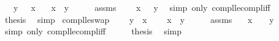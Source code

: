 \begin{isabellebody}
\ \ \ {\isachardoublequoteopen}y\ {\isasymle}\ {\isacharminus}{\kern0pt}\ x{\isachardoublequoteclose}\isanewline
\ \ \ {\isachardoublequoteopen}x\ {\isasymle}\ {\isacharminus}{\kern0pt}y{\isachardoublequoteclose}\isanewline
%
\isadelimproof
%
\endisadelimproof
%
\isatagproof
{}\isamarkupfalse%
\ {\isacharminus}{\kern0pt}\isanewline
\ \ \isamarkupfalse%
\ assms\ \isamarkupfalse%
\ {\isachardoublequoteopen}{\isacharminus}{\kern0pt}\ {\isacharparenleft}{\kern0pt}{\isacharminus}{\kern0pt}\ x{\isacharparenright}{\kern0pt}\ {\isasymle}\ {\isacharminus}{\kern0pt}\ y{\isachardoublequoteclose}\ \isamarkupfalse%
\ {\isacharparenleft}{\kern0pt}simp\ only{\isacharcolon}{\kern0pt}\ compl{\isacharunderscore}{\kern0pt}le{\isacharunderscore}{\kern0pt}compl{\isacharunderscore}{\kern0pt}iff{\isacharparenright}{\kern0pt}\isanewline
\ \ \isamarkupfalse%
\ \isamarkupfalse%
\ {\isacharquery}{\kern0pt}thesis\ \isamarkupfalse%
\ simp\isanewline
{}\isamarkupfalse%
%
\endisatagproof
{\isafoldproof}%
%
\isadelimproof
\isanewline
%
\endisadelimproof
\isanewline
{}\isamarkupfalse%
\ compl{\isacharunderscore}{\kern0pt}le{\isacharunderscore}{\kern0pt}swap{}{\isacharcolon}{\kern0pt}\isanewline
\ \ \ {\isachardoublequoteopen}{\isacharminus}{\kern0pt}\ y\ {\isasymle}\ x{\isachardoublequoteclose}\isanewline
\ \ \ {\isachardoublequoteopen}{\isacharminus}{\kern0pt}\ x\ {\isasymle}\ y{\isachardoublequoteclose}\isanewline
%
\isadelimproof
%
\endisadelimproof
%
\isatagproof
{}\isamarkupfalse%
\ {\isacharminus}{\kern0pt}\isanewline
\ \ \isamarkupfalse%
\ assms\ \isamarkupfalse%
\ {\isachardoublequoteopen}{\isacharminus}{\kern0pt}\ x\ {\isasymle}\ {\isacharminus}{\kern0pt}\ {\isacharparenleft}{\kern0pt}{\isacharminus}{\kern0pt}\ y{\isacharparenright}{\kern0pt}{\isachardoublequoteclose}\ \isamarkupfalse%
\ {\isacharparenleft}{\kern0pt}simp\ only{\isacharcolon}{\kern0pt}\ compl{\isacharunderscore}{\kern0pt}le{\isacharunderscore}{\kern0pt}compl{\isacharunderscore}{\kern0pt}iff{\isacharparenright}{\kern0pt}\isanewline
\ \ \isamarkupfalse%
\ \isamarkupfalse%
\ {\isacharquery}{\kern0pt}thesis\ \isamarkupfalse%
\ simp\isanewline
{}\isamarkupfalse%
%
\endisatagproof
{\isafoldproof}%
%
\isadelimproof
\isanewline
%
\endisadelimproof
\isanewline
{}\isamarkupfalse%

\end{isabellebody}
